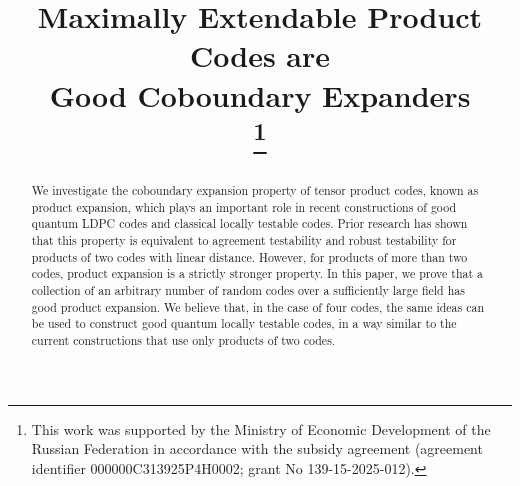 \documentclass[conference]{IEEEtran}
\theoremstyle{plain}
\theoremstyle{definition}
\theoremstyle{remark}
\begin{document}
\title{Maximally Extendable Product Codes are\\ Good Coboundary Expanders\\
\thanks{This work was supported by the Ministry of Economic Development of the Russian Federation in accordance with the subsidy agreement (agreement identifier
000000C313925P4H0002; grant No 139-15-2025-012).}
}



\author{
\and
{}
}





\maketitle

\begin{abstract}
We investigate the coboundary expansion property of tensor product codes, known as product expansion, which plays an important role in recent constructions of good quantum LDPC codes and classical locally testable codes. Prior research has shown that this property is equivalent to agreement testability and robust testability for products of two codes with linear distance. However, for products of more than two codes, product expansion is a strictly stronger property. In this paper, we prove that a collection of an arbitrary number of random codes over a sufficiently large field has good product expansion. We believe that, in the case of four codes, the same ideas can be used to construct good quantum locally testable codes, in a way similar to the current constructions that use only products of two codes.
\end{abstract}
\end{document}
